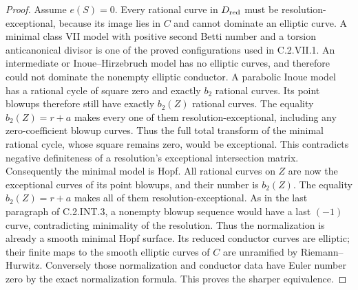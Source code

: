 \begin{proof}
Assume $e(S)=0$. Every rational curve in
$D_{\rm red}$ must be resolution-exceptional,
because its image lies in $C$ and cannot
dominate an elliptic curve. A minimal class
VII model with positive second Betti number
and a torsion anticanonical divisor is one
of the proved configurations used in
C.2.VII.1. An intermediate or
Inoue--Hirzebruch model has no elliptic
curves, and therefore could not dominate
the nonempty elliptic conductor. A
parabolic Inoue model has a rational cycle
of square zero and exactly $b_2$ rational
curves. Its point blowups therefore still
have exactly $b_2(Z)$ rational curves.
The equality $b_2(Z)=r+a$ makes every one
of them resolution-exceptional, including
any zero-coefficient blowup curves. Thus
the full total transform of the minimal
rational cycle, whose square remains zero,
would be exceptional. This contradicts
negative definiteness of a resolution's
exceptional intersection matrix.
Consequently the minimal model is Hopf.
All rational curves on $Z$ are now the
exceptional curves of its point blowups,
and their number is $b_2(Z)$.
The equality $b_2(Z)=r+a$ makes all of
them resolution-exceptional. As in the
last paragraph of C.2.INT.3, a nonempty
blowup sequence would have a last
$(-1)$ curve, contradicting minimality
of the resolution. Thus the normalization
is already a smooth minimal Hopf surface.
Its reduced conductor curves are elliptic;
their finite maps to the smooth elliptic
curves of $C$ are unramified by
Riemann--Hurwitz.
Conversely those normalization and
conductor data have Euler number zero
by the exact normalization formula.
This proves the sharper equivalence.
\end{proof}
